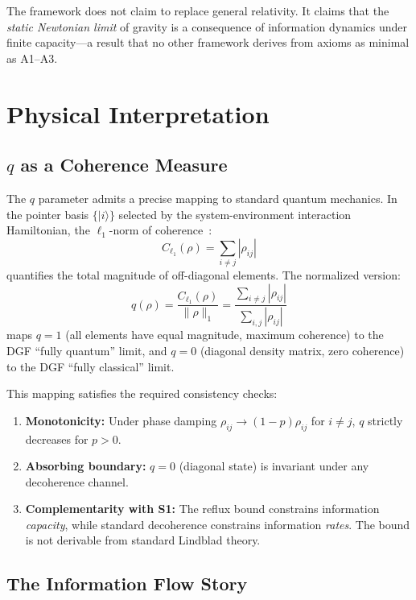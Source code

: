 \documentclass[reprint]{revtex4-2}
\begin{document}
The framework does not claim to replace general relativity. It claims that the \emph{static Newtonian limit} of gravity is a consequence of information dynamics under finite capacity---a result that no other framework derives from axioms as minimal as A1--A3.

\section{Physical Interpretation}
\label{sec:interpretation}

\subsection{$q$ as a Coherence Measure}

The $q$ parameter admits a precise mapping to standard quantum mechanics. In the pointer basis $\{|i\rangle\}$ selected by the system-environment interaction Hamiltonian, the $\ell_1$-norm of coherence~\cite{Baumgratz2014}:
\begin{equation}
C_{\ell_1}(\rho) = \sum_{i\neq j}|\rho_{ij}|
\end{equation}
quantifies the total magnitude of off-diagonal elements. The normalized version:
\begin{equation}
q(\rho) = \frac{C_{\ell_1}(\rho)}{\|\rho\|_1} = \frac{\sum_{i\neq j}|\rho_{ij}|}{\sum_{i,j}|\rho_{ij}|}
\end{equation}
maps $q=1$ (all elements have equal magnitude, maximum coherence) to the DGF ``fully quantum'' limit, and $q=0$ (diagonal density matrix, zero coherence) to the DGF ``fully classical'' limit.

This mapping satisfies the required consistency checks:
\begin{enumerate}
\item \textbf{Monotonicity:} Under phase damping $\rho_{ij}\to (1-p)\rho_{ij}$ for $i\neq j$, $q$ strictly decreases for $p>0$.
\item \textbf{Absorbing boundary:} $q=0$ (diagonal state) is invariant under any decoherence channel.
\item \textbf{Complementarity with S1:} The reflux bound constrains information \emph{capacity}, while standard decoherence constrains information \emph{rates}. The bound is not derivable from standard Lindblad theory.
\end{enumerate}

\subsection{The Information Flow Story}
\end{document}

